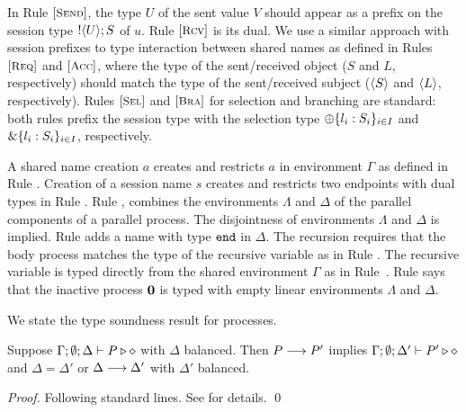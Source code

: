 In Rule ${\footnotesize[\textrm{\small \textsc{Send}}]}$, 
the type $U$ of the sent value $V$ should appear as a prefix
on the session type $! \langle U \rangle ; S$ of $u$.
Rule ${\footnotesize[\textrm{\small \textsc{Rcv}}]}$ is its dual.  
We use a similar approach with session prefixes
to type interaction between shared names as defined 
in Rules ${\footnotesize[\textrm{\small \textsc{Req}}]}$ and ${\footnotesize[\textrm{\small \textsc{Acc}}]}$,
where the type of the sent/received object 
($S$ and $L$, respectively) should
match the type of the sent/received subject
($\langle S \rangle$ and $\langle L \rangle$, respectively).
Rules 
${\footnotesize[\textrm{\small \textsc{Sel}}]}$ and ${\footnotesize[\textrm{\small \textsc{Bra}}]}$ for selection and branching are standard: 
both
rules prefix the session type with the selection
type $\oplus \{l_i: S_i\}_{i \in I}$ and
$\& \{l_i:S_i\}_{i \in I}$, respectively.

A
shared name creation $a$ creates and restricts
$a$ in environment $\Gamma$ as defined in 
Rule . 
Creation of a session name $s$
creates and restricts two endpoints with dual types 
in Rule . 
Rule , 
combines the environments
$\Lambda$ and $\Delta$ of
the parallel components of a parallel process.
The disjointness of environments $\Lambda$ and $\Delta$
is implied. Rule  adds 
a name with type $\mathtt{end}$ in $\Delta$.  
The recursion requires that the body process 
matches the type of the recursive
variable as in Rule .
The recursive variable is typed
directly from the shared environment $\Gamma$ as
in Rule~.
Rule  says that 
the inactive process $\mathbf{0}$ is typed with empty linear environments  $\Lambda$ and $\Delta$.


We state the type soundness result for \HOp processes.



\begin{theorem}\label{t:sr}%
			Suppose $\Gamma; \emptyset; \Delta \vdash P \triangleright \diamond$
			with
			$\Delta$ balanced. 
			Then $P \longrightarrow P'$ implies $\Gamma; \emptyset; \Delta'  \vdash P' \triangleright \diamond$
			and $\Delta = \Delta'$ or $\Delta \longrightarrow \Delta'$
			with $\Delta'$ balanced. 
\end{theorem}
\begin{proof} Following standard lines.
See  for details. \qed %
\end{proof}

